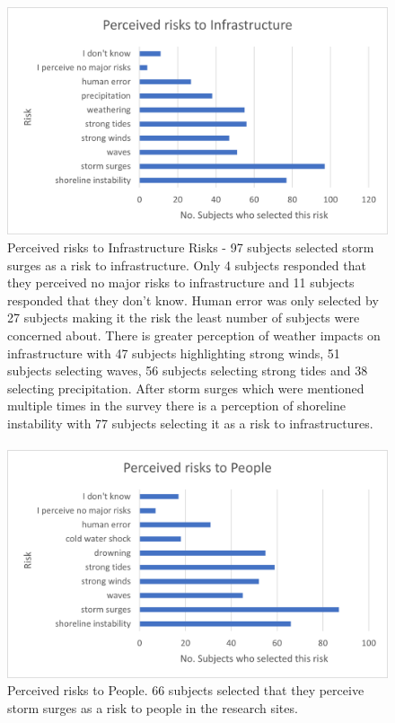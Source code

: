 \begin{figure}[H]
    \centering
    \includegraphics{fig_results/percieved risks to infrastructure.png}
    \caption{Perceived risks to Infrastructure Risks - 97 subjects selected storm surges as a risk to infrastructure. Only 4 subjects responded that they perceived no major risks to infrastructure and 11 subjects responded that they don't know. Human error was only selected by 27 subjects making it the risk the least number of subjects were concerned about. There is greater perception of weather impacts on infrastructure with 47 subjects highlighting strong winds, 51 subjects selecting waves, 56 subjects selecting strong tides and 38 selecting precipitation. After storm surges which were mentioned multiple times in the survey there is a perception of shoreline instability with 77 subjects selecting it as a risk to infrastructures.   }
    \label{fig:my_label}
\end{figure}
\paragraph{}





\begin{figure}[H]
    \centering
    \includegraphics{fig_results/percieved risks to people.png}
    \caption{Perceived risks to People. 66 subjects selected that they perceive storm surges as a risk to people in the research sites. }
    \label{fig:my_label}
\end{figure}
